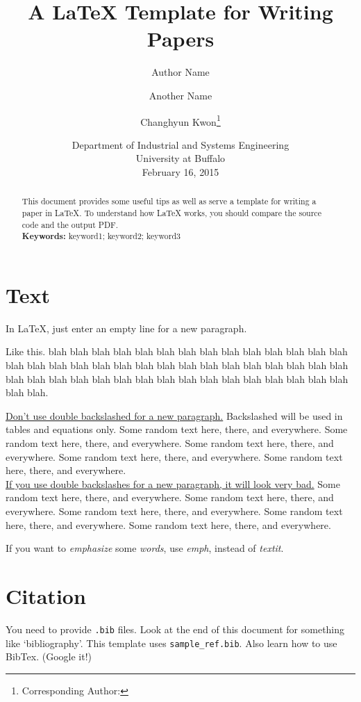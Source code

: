 \documentclass[letterpaper, 11pt]{article}
\title{A LaTeX Template for Writing Papers}
\author{Author Name \and Another Name \and Changhyun Kwon\footnote{Corresponding Author: \email{chkwon@buffalo.edu}}}
\date{Department of Industrial and Systems Engineering\\University at Buffalo\\[0.5cm] February 16, 2015}
\begin{document}
\maketitle

\begin{abstract}
This document provides some useful tips as well as serve a template for writing a paper in LaTeX. To understand how LaTeX works, you should compare the source code and the output PDF.\\
\noindent\textbf{Keywords:} keyword1; keyword2; keyword3
\end{abstract}



\section{Text} \label{sec:paragraph}
In LaTeX, just enter an empty line for a new paragraph.

Like this. blah blah blah blah blah blah blah blah blah blah blah blah blah blah blah blah blah blah blah blah blah blah blah blah blah blah blah blah blah blah blah blah blah blah blah blah blah blah blah blah blah blah blah blah blah blah blah blah.

\uline{Don't use double backslashed for a new paragraph.} Backslashed will be used in tables and equations only. Some random text here, there, and everywhere. Some random text here, there, and everywhere. Some random text here, there, and everywhere. Some random text here, there, and everywhere. Some random text here, there, and everywhere.  \\
\uline{If you use double backslashes for a new paragraph, it will look very bad.} Some random text here, there, and everywhere. Some random text here, there, and everywhere. Some random text here, there, and everywhere. Some random text here, there, and everywhere. Some random text here, there, and everywhere. 

If you want to \emph{emphasize} some \emph{words}, use \emph{emph}, instead of \textit{textit}.




\section{Citation} \label{sec:citation}

You need to provide \texttt{.bib} files. Look at the end of this document for something like `bibliography'. This template uses \texttt{sample\_ref.bib}. Also learn how to use BibTex. (Google it!)
\end{document}
